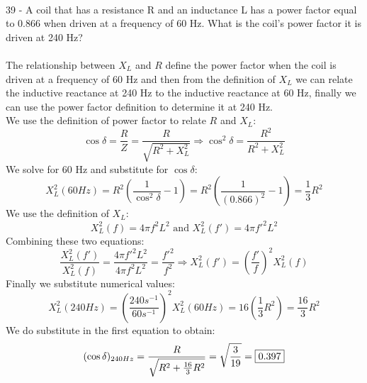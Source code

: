 \documentclass{report}
\begin{document}
\paragraph{}
39 - A coil that has a resistance R and an inductance L has a power factor equal to 0.866 when driven at a frequency of 60 Hz. What is the coil’s power factor it is driven at 240 Hz?\\
\\
The relationship between $X_L$ and $R$ define the power factor when the coil is driven at a frequency of 60 Hz and then from the definition of $X_L$ we can relate the inductive reactance at 240 Hz to the inductive reactance at 60 Hz, finally we can use the power factor definition to determine it at 240 Hz.\\
We use the definition of power factor to relate $R$ and $X_L$:
$$\cos \delta = \frac{R}{Z} = \frac{R}{\sqrt{R^2 + X_L^2}} \Rightarrow \cos^2 \delta = \frac{R^2}{R^2 + X_L^2}$$
We solve for 60 Hz and substitute for $\cos \delta$:
$$X_L^2(60Hz) = R^2\left( \frac{1}{\cos^2 \delta} - 1 \right) = R^2\left( \frac{1}{(0.866)^2} - 1 \right) = \frac{1}{3}R^2$$
We use the definition of $X_L$:
$$X_L^2(f) = 4\pi f^2L^2 \text{ and } X_L^2(f') = 4\pi f'^2L^2$$
Combining these two equations:
$$\frac{X_L^2(f')}{X_L^2(f)} = \frac{4\pi f'^2L^2}{4\pi f^2L^2} = \frac{f'^2}{f^2} \Rightarrow X_L^2(f') = \left( \frac{f'}{f} \right)^2X_L^2(f)$$
Finally we substitute numerical values:
$$X_L^2(240Hz) = \left( \frac{240s^{-1}}{60s^{-1}} \right)^2 X_L^2(60Hz) = 16\left( \frac{1}{3}R^2 \right) = \frac{16}{3}R^2$$
We do substitute in the first equation to obtain:
$$(\cos \delta)_{240Hz} = \frac{R}{\sqrt{R^2 + \frac{16}{3}R^2}} = \sqrt{\frac{3}{19}} = \fbox{0.397}$$
\end{document}
